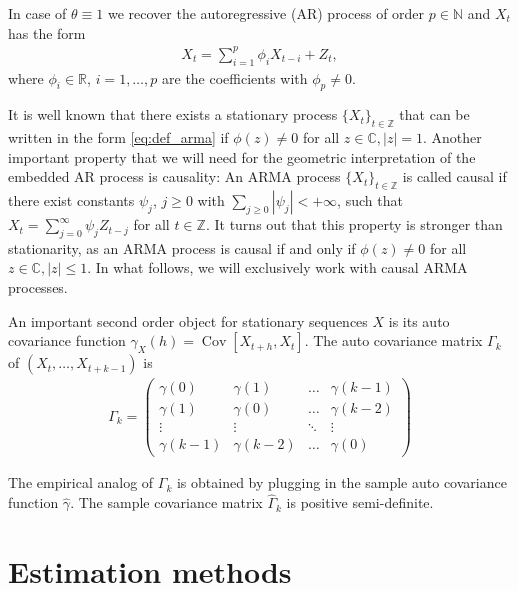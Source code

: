 In case of $\theta\equiv1$ we recover the autoregressive (AR) process of order $p\in\mathbb{N}$ and $X_t$ has the form
\begin{align}\label{eq:ar(p)}
    X_t=\sum_{i=1}^{p}\phi_iX_{t-i}+Z_t,
\end{align}
where $\phi_i\in\mathbb{R}$, $i=1,\dots,p$ are the coefficients with $\phi_p\ne0$.

It is well known that there exists a stationary process $\{X_t\}_{t\in\mathbb{Z}}$ that can be written in the form \eqref{eq:def_arma} if $\phi(z)\neq0$ for all $z\in\mathbb{C},\lvert z\rvert=1$. Another important property that we will need for the geometric interpretation of the embedded AR process is causality: An ARMA process $\{X_t\}_{t\in\mathbb{Z}}$ is called causal if there exist constants $\psi_j$, $j\ge0$ with $\sum_{j\ge0}|\psi_j|<+\infty$, such that $X_t=\sum_{j=0}^{\infty}\psi_jZ_{t-j}$ for all $t\in\mathbb{Z}$. It turns out that this property is stronger than stationarity, as an ARMA process is causal if and only if $\phi(z)\neq0$ for all $z\in\mathbb{C},\lvert z\rvert\le1$. In what follows, we will exclusively work with causal ARMA processes.


An important second order object for stationary sequences $X$ is its auto covariance function $\gamma_X(h)=\operatorname{Cov}[X_{t+h},X_t]$. The auto covariance matrix $\Gamma_k$ of $(X_t,\dots,X_{t+k-1})$ is
\begin{align*}
    \Gamma_k=\begin{pmatrix}
        \gamma(0) & \gamma(1) & \dots & \gamma(k-1)\\
        \gamma(1) & \gamma(0) & \dots & \gamma(k-2)\\
        \vdots & \vdots & \ddots & \vdots\\
        \gamma(k-1) & \gamma(k-2) & \dots & \gamma(0)
    \end{pmatrix}
\end{align*}

The empirical analog of $\Gamma_k$ is obtained by plugging in the sample auto covariance function $\hat{\gamma}$. The sample covariance matrix $\hat{\Gamma}_k$ is positive semi-definite.


\section{Estimation methods}\label{sec:classical_estimation_methods}

